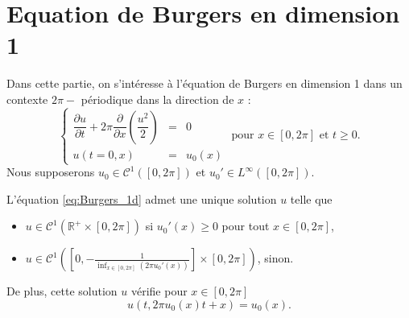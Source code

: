 \section{Equation de Burgers en dimension 1}

Dans cette partie, on s'intéresse à l'équation de Burgers \cite{Burgers1948, Witham1974} en dimension 1 dans un contexte $2 \pi -$ périodique dans la direction de $x$ :
\begin{equation}
\left\lbrace
\begin{array}{rcl}
\dfrac{\partial u}{\partial t} + 2 \pi \dfrac{\partial}{\partial x} \left( \dfrac{u^2}{2} \right) & = & 0 \\
u(t=0,x) & = & u_0(x)
\end{array}
\right. \text{ pour } x \in [0, 2\pi] \text{ et } t \geq 0.
\label{eq:Burgers_1d}
\end{equation}
Nous supposerons $u_0 \in \mathcal{C}^1([0,2 \pi])$ et $u_0' \in L^{\infty}([0,2 \pi])$.

\begin{theoreme}
L'équation \eqref{eq:Burgers_1d} admet une unique solution $u$ telle que
\begin{itemize}
\item $u \in \mathcal{C}^1(\mathbb{R}^+ \times [0, 2 \pi])$ si $u_0'(x) \geq 0$ pour tout $x \in [0,2 \pi]$,

\item $u \in \mathcal{C}^1\left(\left[0, -\frac{1}{\inf_{x \in [0,2\pi]} (2 \pi u_0'(x))}\right] \times [0, 2 \pi]\right)$, sinon.
\end{itemize}
De plus, cette solution $u$ vérifie pour $x \in [0, 2 \pi]$
\begin{equation}
u(t,2 \pi u_0(x)t + x)=u_0(x).
\end{equation}
\end{theoreme}

